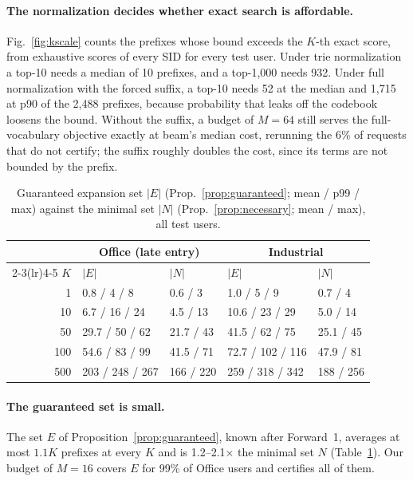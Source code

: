 \documentclass[sigconf,anonymous]{acmart}
\begin{document}
\paragraph{The normalization decides whether exact search is affordable.} Fig.~\ref{fig:kscale} counts the prefixes
whose bound exceeds the $K$-th exact score, from exhaustive scores of every SID for every test user. Under trie
normalization a top-10 needs a median of 10 prefixes, and a top-1,000 needs 932. Under full normalization with the
forced suffix, a top-10 needs 52 at the median and 1,715 at p90 of the 2,488 prefixes, because probability that
leaks off the codebook loosens the bound. Without the suffix, a budget of $M=64$ still serves the full-vocabulary
objective exactly at beam's median cost, rerunning the 6\% of requests that do not certify; the suffix roughly
doubles the cost, since its terms are not bounded by the prefix.

\begin{table}[t]
\caption{Guaranteed expansion set $|E|$ (Prop.~\ref{prop:guaranteed}; mean / p99 / max) against the minimal set
$|N|$ (Prop.~\ref{prop:necessary}; mean / max), all test users.}
\label{tab:bounds}
\vspace{-2mm}
\small
\setlength{\tabcolsep}{3pt}
\begin{tabular*}{\linewidth}{@{\extracolsep{\fill}}rllll@{}}
\toprule
& \multicolumn{2}{c}{Office (late entry)} & \multicolumn{2}{c}{Industrial} \\
\cmidrule(lr){2-3}\cmidrule(lr){4-5}
$K$ & $|E|$ & $|N|$ & $|E|$ & $|N|$ \\
\midrule
1   & 0.8 / 4 / 8       & 0.6 / 3    & 1.0 / 5 / 9       & 0.7 / 4 \\
10  & 6.7 / 16 / 24     & 4.5 / 13   & 10.6 / 23 / 29    & 5.0 / 14 \\
50  & 29.7 / 50 / 62    & 21.7 / 43  & 41.5 / 62 / 75    & 25.1 / 45 \\
100 & 54.6 / 83 / 99    & 41.5 / 71  & 72.7 / 102 / 116  & 47.9 / 81 \\
500 & 203 / 248 / 267   & 166 / 220  & 259 / 318 / 342   & 188 / 256 \\
\bottomrule
\end{tabular*}
\vspace{-3mm}
\end{table}

\paragraph{The guaranteed set is small.} The set $E$ of Proposition~\ref{prop:guaranteed}, known after Forward~1,
averages at most $1.1K$ prefixes at every $K$ and is 1.2--2.1$\times$ the minimal set $N$ (Table~\ref{tab:bounds}).
Our budget of $M=16$ covers $E$ for 99\% of Office users and certifies all of them.
\end{document}
